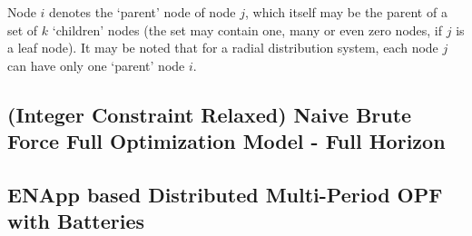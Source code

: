 \documentclass{article}
\begin{document}
Node $i$ denotes the `parent' node of node $j$, which itself may be the parent of a set of $k$ `children' nodes (the set may contain one, many or even zero nodes, if $j$ is a leaf node). It may be noted that for a radial distribution system, each node $j$ can have only one `parent' node $i$.

\subsection*{(Integer Constraint Relaxed) Naive Brute Force Full Optimization Model - Full Horizon}



\subsection{ENApp based Distributed Multi-Period OPF with Batteries}
\end{document}
